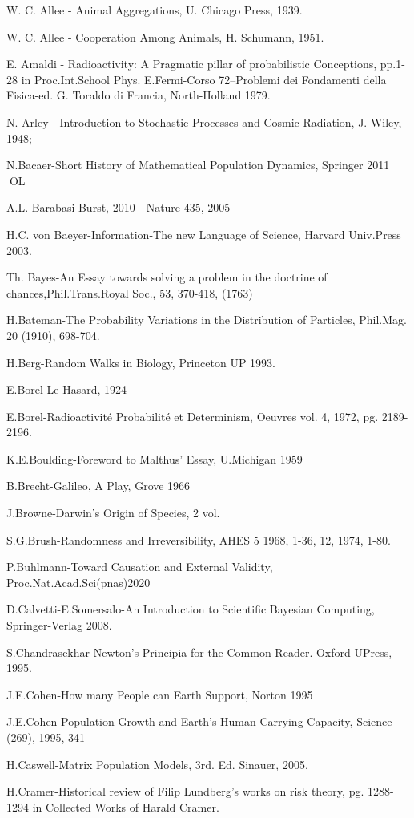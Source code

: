 W. C. Allee - Animal Aggregations, U. Chicago Press, 1939.

W. C. Allee - Cooperation Among Animals, H. Schumann, 1951.

E. Amaldi - Radioactivity: A Pragmatic pillar of probabilistic Conceptions, pp.1-28 in Proc.Int.School Phys. E.Fermi-Corso 72–Problemi dei Fondamenti della Fisica-ed. G. Toraldo di Francia, North-Holland 1979.

N. Arley - Introduction to Stochastic Processes and Cosmic Radiation, J. Wiley, 1948;

N.Bacaer-Short History of Mathematical Population Dynamics, Springer 2011 OL

A.L. Barabasi-Burst, 2010 - Nature 435, 2005

H.C. von Baeyer-Information-The new Language of Science, Harvard Univ.Press 2003.

Th. Bayes-An Essay towards solving a problem in the doctrine of chances,Phil.Trans.Royal Soc., 53, 370-418, (1763)

H.Bateman-The Probability Variations in the Distribution of Particles, Phil.Mag. 20 (1910), 698-704.

H.Berg-Random Walks in Biology, Princeton UP 1993.

E.Borel-Le Hasard, 1924

E.Borel-Radioactivité Probabilité et Determinism, Oeuvres vol. 4, 1972, pg. 2189-2196.

K.E.Boulding-Foreword to Malthus’ Essay, U.Michigan 1959

B.Brecht-Galileo, A Play, Grove 1966

J.Browne-Darwin’s Origin of Species, 2 vol.

S.G.Brush-Randomness and Irreversibility, AHES 5 1968, 1-36, 12, 1974, 1-80.

P.Buhlmann-Toward Causation and External Validity, Proc.Nat.Acad.Sci(pnas)2020

D.Calvetti-E.Somersalo-An Introduction to Scientific Bayesian Computing, Springer-Verlag 2008.

S.Chandrasekhar-Newton’s Principia for the Common Reader. Oxford UPress, 1995.

J.E.Cohen-How many People can Earth Support, Norton 1995

J.E.Cohen-Population Growth and Earth’s Human Carrying Capacity, Science (269), 1995, 341-

H.Caswell-Matrix Population Models, 3rd. Ed. Sinauer, 2005.

H.Cramer-Historical review of Filip Lundberg’s works on risk theory, pg. 1288-1294 in Collected Works of Harald Cramer.

